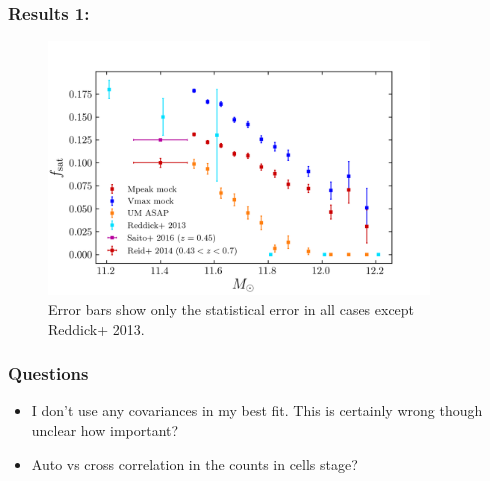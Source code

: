 \documentclass[t]{beamer}
\begin{document}
\begin{frame}
    \frametitle{Results 1: \fsat{}}

    \begin{figure}
    \includegraphics[width=0.9\textwidth]{images/sat_frac.png}
    \caption{Error bars show only the statistical error in all cases except Reddick+ 2013.}
    \end{figure}
\end{frame}

\begin{frame}
    \frametitle{Questions}
    \begin{itemize}
        \item I don't use any covariances in my best fit. This is certainly wrong though unclear how important?
        \item Auto vs cross correlation in the counts in cells stage?
    \end{itemize}
\end{frame}
\end{document}
